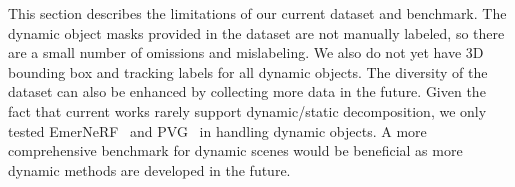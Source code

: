 This section describes the limitations of our current dataset and benchmark. The dynamic object masks provided in the dataset are not manually labeled, so there are a small number of omissions and mislabeling. We also do not yet have 3D bounding box and tracking labels for all dynamic objects. The diversity of the dataset can also be enhanced by collecting more data in the future.
Given the fact that current works rarely support dynamic/static decomposition, we only tested EmerNeRF~\cite{yang2023emernerf} and PVG~\cite{chen2023pvg} in handling dynamic objects. A more comprehensive benchmark for dynamic scenes would be beneficial as more dynamic methods are developed in the future.
